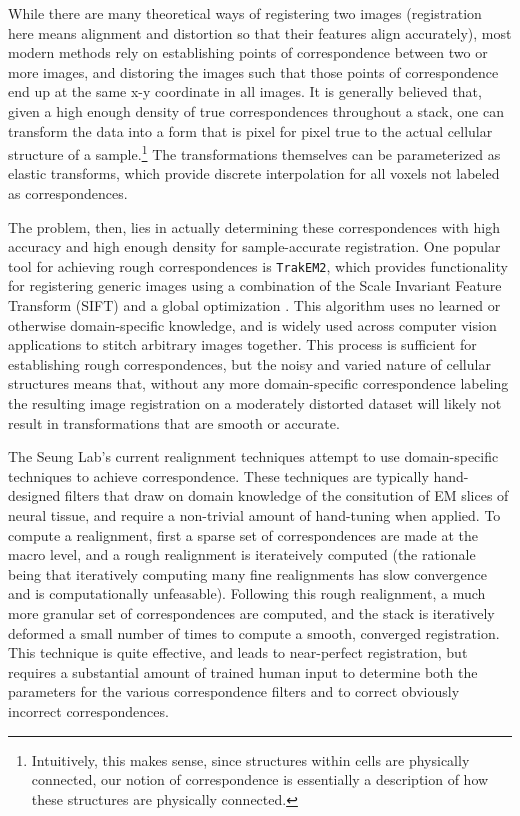 While there are many theoretical ways of registering two images (registration here means alignment and distortion so that their features align accurately), most modern methods rely on establishing points of correspondence between two or more images, and distoring the images such that those points of correspondence end up at the same x-y coordinate in all images. It is generally believed that, given a high enough density of true correspondences throughout a stack, one can transform the data into a form that is pixel for pixel true to the actual cellular structure of a sample.\footnote{Intuitively, this makes sense, since structures within cells are physically connected, our notion of correspondence is essentially a description of how these structures are physically connected.} The transformations themselves can be parameterized as elastic transforms, which provide discrete interpolation for all voxels not labeled as correspondences.

The problem, then, lies in actually determining these correspondences with high accuracy and high enough density for sample-accurate registration. One popular tool for achieving rough correspondences is \texttt{TrakEM2}, which provides functionality for registering generic images using a combination of the Scale Invariant Feature Transform (SIFT) and a global optimization \cite{Lowe1999}. This algorithm uses no learned or otherwise domain-specific knowledge, and is widely used across computer vision applications to stitch arbitrary images together. This process is sufficient for establishing rough correspondences, but the noisy and varied nature of cellular structures means that, without any more domain-specific correspondence labeling the resulting image registration on a moderately distorted dataset will likely not result in transformations that are smooth or accurate.

The Seung Lab's current realignment techniques attempt to use domain-specific techniques to achieve correspondence. These techniques are typically hand-designed filters that draw on domain knowledge of the consitution of EM slices of neural tissue, and require a non-trivial amount of hand-tuning when applied. To compute a realignment, first a sparse set of correspondences are made at the macro level, and a rough realignment is iterateively computed (the rationale being that iteratively computing many fine realignments has slow convergence and is computationally unfeasable). Following this rough realignment, a much more granular set of correspondences are computed, and the stack is iteratively deformed a small number of times to compute a smooth, converged registration. This technique is quite effective, and leads to near-perfect registration, but requires a substantial amount of trained human input to determine both the parameters for the various correspondence filters and to correct obviously incorrect correspondences.

